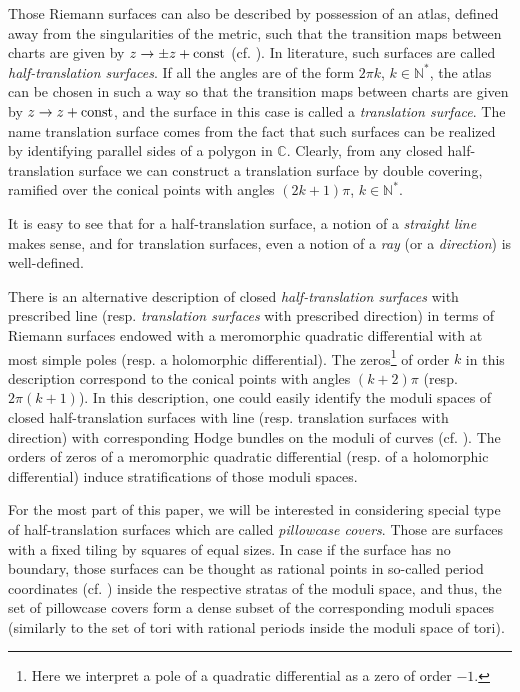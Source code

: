 \documentclass[12pt]{article}
\numberwithin{equation}{section}
\theoremstyle{theorem}
\theoremstyle{definition}
\theoremstyle{remark}
\newcommand{\comp}{\mathbb{C}}
\newcommand{\nat}{\mathbb{N}}
\begin{document}
 	Those Riemann surfaces can also be described by possession of an atlas, defined away from the singularities of the metric, such that the transition maps between charts are given by $z \to \pm z + {\rm{const}}$ (cf. \cite[\S 3.3]{ZorichFlatSurf}).
	In literature, such surfaces are called \textit{half-translation surfaces}.
 	If all the angles are of the form $2 \pi k$, $k \in \nat^*$, the atlas can be chosen in such a way so that the transition maps between charts are given by $z \to z + {\rm{const}}$, and the surface in this case is called a \textit{translation surface}.
 	The name translation surface comes from the fact that such surfaces can be realized by identifying parallel sides of a polygon in $\comp$.
 	Clearly, from any closed half-translation surface we can construct a translation surface by double covering, ramified over the conical points with angles $(2 k + 1) \pi$, $k \in \nat^*$.
 	\par 
 	It is easy to see that for a half-translation surface, a notion of a \textit{straight line} makes sense, and for translation surfaces, even a notion of a \textit{ray} (or a \textit{direction}) is well-defined.
 	\par There is an alternative description of closed \textit{half-translation surfaces} with prescribed line (resp. \textit{translation surfaces} with prescribed direction) in terms of Riemann surfaces endowed with a meromorphic quadratic differential with at most simple poles (resp. a holomorphic differential). The zeros\footnote{Here we interpret a pole of a quadratic differential as a zero of order $-1$.} of order $k$ in this description correspond to the conical points with angles $(k + 2) \pi$ (resp. $2 \pi (k + 1)$). In this description, one could easily identify the moduli spaces of closed half-translation surfaces with line (resp. translation surfaces with direction) with corresponding Hodge bundles on the moduli of curves (cf. \cite[\S 8.1]{ZorichFlatSurf}). The orders of zeros of a meromorphic quadratic differential (resp. of a holomorphic differential) induce stratifications of those moduli spaces.
 	\par 
	For the most part of this paper, we will be interested in considering special type of half-translation surfaces which are called \textit{pillowcase covers}. Those are surfaces with a fixed tiling by squares of equal sizes.
	In case if the surface has no boundary, those surfaces can be thought as rational points in so-called period coordinates (cf. \cite[\S 7.1]{ZorichFlatSurf}) inside the respective stratas of the moduli space, and thus, the set of pillowcase covers form a dense subset of the corresponding moduli spaces (similarly to the set of tori with rational periods inside the moduli space of tori).
\end{document}
